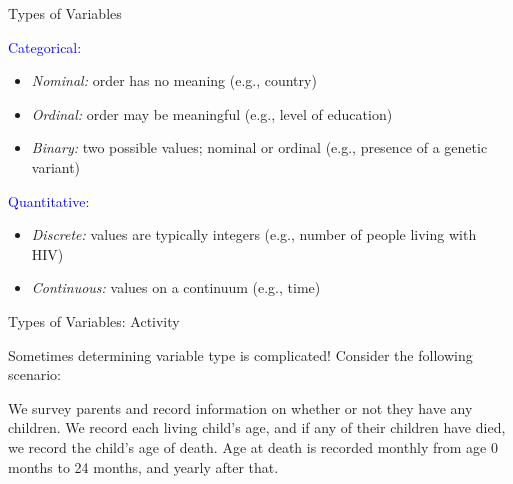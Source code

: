 \documentclass[10pt,t]{beamer}
\begin{document}
\begin{frame}{Types of Variables}

\textcolor{blue}{Categorical:} 

\vspace{0.3cm}

\begin{itemize}
	\item \textit{Nominal:} order has no meaning (e.g., country)
	\item \textit{Ordinal:} order may be meaningful (e.g., level of education)
	\item \textit{Binary:} two possible values; nominal or ordinal (e.g., presence of a genetic variant)
\end{itemize}

\vspace{0.3cm}

\textcolor{blue}{Quantitative:} 

\vspace{0.3cm}

\begin{itemize}
	\item \textit{Discrete:} values are typically integers (e.g., number of people living with HIV)
	\item \textit{Continuous:} values on a continuum (e.g., time)
\end{itemize}

\end{frame}

\begin{frame}{Types of Variables: Activity}

Sometimes determining variable type is complicated! Consider the following scenario:

\vspace{0.3cm}

We survey parents and record information on whether or not they have any children. We record each living child's age, and if any of their children have died, we record the child's age of death. Age at death is recorded monthly from age 0 months to 24 months, and yearly after that. 

\end{frame}
\end{document}
